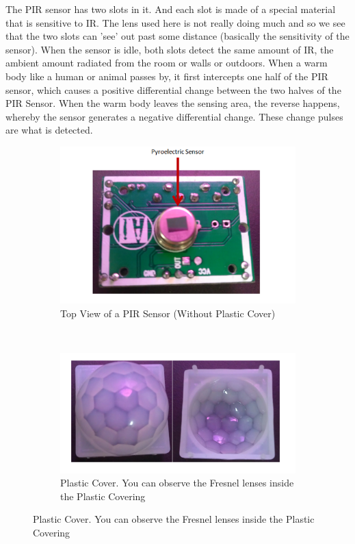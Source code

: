 \documentclass[a4paper,12 pt]{article}
\begin{document}
The PIR sensor has two slots in it. And each slot is made of a special material that is sensitive to IR. The lens used here is not really doing much and so we see that the two slots can 'see' out past some distance (basically the sensitivity of the sensor). When the sensor is idle, both slots detect the same amount of IR, the ambient amount radiated from the room or walls or outdoors. When a warm body like a human or animal passes by, it first intercepts one half of the PIR sensor, which causes a positive differential change between the two halves of the PIR Sensor. When the warm body leaves the sensing area, the reverse happens, whereby the sensor generates a negative differential change. These change pulses are what is detected.
\pagebreak
\begin{figure}[h]
        \centering
        \begin{subfigure}[b]{0.45\textwidth}
                \includegraphics[width=\textwidth]{pyr.png}
                \caption{ Top View of a PIR Sensor (Without Plastic Cover)}
                \label{fig:8a}
        \end{subfigure}%
        ~ %
        \begin{subfigure}[b]{0.45\textwidth}
                \includegraphics[width=\textwidth]{pyr1.png}
                \caption{Plastic Cover. You can observe the Fresnel lenses inside the Plastic Covering}
                \label{fig:8b}
        \end{subfigure}
        
\end{figure}
\end{document}
